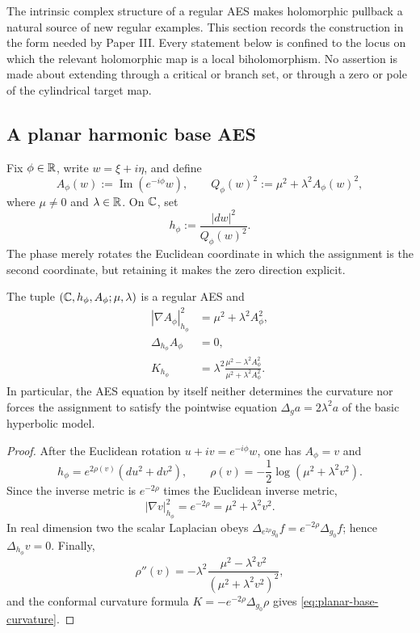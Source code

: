 The intrinsic complex structure of a regular AES makes holomorphic pullback a
natural source of new regular examples.  This section records the construction in
the form needed by Paper III.  Every statement below is confined to the locus on
which the relevant holomorphic map is a local biholomorphism.  No assertion is made
about extending through a critical or branch set, or through a zero or pole of the
cylindrical target map.

\subsection{A planar harmonic base AES}

Fix \(\phi\in\mathbb{R}\), write \(w=\xi+i\eta\), and define
\begin{equation}\label{eq:planar-base-assignment}
 A_\phi(w):=\operatorname{Im}(e^{-i\phi}w),
 \qquad
 Q_\phi(w)^2:=\mu^2+\lambda^2A_\phi(w)^2,
\end{equation}
where \(\mu\ne0\) and \(\lambda\in\mathbb{R}\).  On \(\mathbb{C}\), set
\begin{equation}\label{eq:planar-base-metric}
 h_\phi:=\frac{|dw|^2}{Q_\phi(w)^2}.
\end{equation}
The phase merely rotates the Euclidean coordinate in which the assignment is the
second coordinate, but retaining it makes the zero direction explicit.

\begin{proposition}
\label{prop:planar-harmonic-aes}
The tuple \((\mathbb{C},h_\phi,A_\phi;\mu,\lambda)\) is a regular AES and
\begin{align}
 |\nabla A_\phi|_{h_\phi}^2
 &=\mu^2+\lambda^2A_\phi^2,
 \label{eq:planar-base-eikonal}\\
 \Delta_{h_\phi}A_\phi&=0,
 \label{eq:planar-base-harmonicity}\\
 K_{h_\phi}
 &=\lambda^2
   \frac{\mu^2-\lambda^2A_\phi^2}
        {\mu^2+\lambda^2A_\phi^2}.
 \label{eq:planar-base-curvature}
\end{align}
In particular, the AES equation by itself neither determines the curvature nor
forces the assignment to satisfy the pointwise equation
\(\Delta_g a=2\lambda^2a\) of the basic hyperbolic model.
\end{proposition}

\begin{proof}
After the Euclidean rotation \(u+i v=e^{-i\phi}w\), one has
\(A_\phi=v\) and
\[
 h_\phi=e^{2\rho(v)}(du^2+dv^2),
 \qquad
 \rho(v)=-\frac12\log(\mu^2+\lambda^2v^2).
\]
Since the inverse metric is \(e^{-2\rho}\) times the Euclidean inverse metric,
\[
 |\nabla v|_{h_\phi}^2=e^{-2\rho}
 =\mu^2+\lambda^2v^2.
\]
In real dimension two the scalar Laplacian obeys
\(\Delta_{e^{2\rho}g_0}f=e^{-2\rho}\Delta_{g_0}f\); hence
\(\Delta_{h_\phi}v=0\).  Finally,
\[
 \rho''(v)
 =-\lambda^2\frac{\mu^2-\lambda^2v^2}
                         {(\mu^2+\lambda^2v^2)^2},
\]
and the conformal curvature formula
\(K=-e^{-2\rho}\Delta_{g_0}\rho\) gives
\eqref{eq:planar-base-curvature}.
\end{proof}

